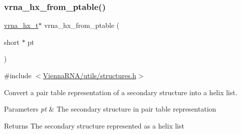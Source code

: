\subsubsection{\texorpdfstring{vrna\_hx\_from\_ptable()}{vrna\_hx\_from\_ptable()}}
{\footnotesize\ttfamily \mbox{\hyperlink{group__struct__utils__helix__list_ga877363f3a1703b53ecd025c6fcf897a0}{vrna\+\_\+hx\+\_\+t}}$\ast$ vrna\+\_\+hx\+\_\+from\+\_\+ptable (\begin{DoxyParamCaption}\item[{short $\ast$}]{pt }\end{DoxyParamCaption})}



{\ttfamily \#include $<$\mbox{\hyperlink{utils_2structures_8h}{Vienna\+R\+N\+A/utils/structures.\+h}}$>$}



Convert a pair table representation of a secondary structure into a helix list. 


\begin{DoxyParams}{Parameters}
{\em pt} & The secondary structure in pair table representation \\
\hline
\end{DoxyParams}
\begin{DoxyReturn}{Returns}
The secondary structure represented as a helix list 
\end{DoxyReturn}
